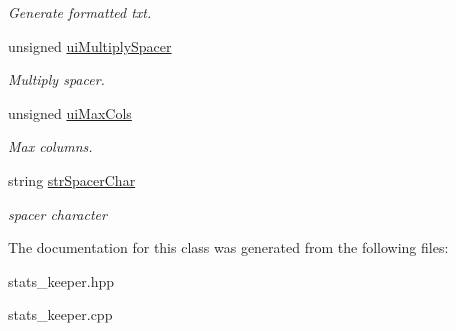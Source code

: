 \begin{DoxyCompactItemize}
\begin{DoxyCompactList}\small\item\em Generate formatted txt. \item\end{DoxyCompactList}\item 
\hypertarget{classstats__keeper_a77ee69cc8b6a80296c69b8af4de678f1}{
unsigned \hyperlink{classstats__keeper_a77ee69cc8b6a80296c69b8af4de678f1}{uiMultiplySpacer}}
\label{classstats__keeper_a77ee69cc8b6a80296c69b8af4de678f1}

\begin{DoxyCompactList}\small\item\em Multiply spacer. \item\end{DoxyCompactList}\item 
\hypertarget{classstats__keeper_ac5ad6cbbee0763290d1569ee7ff70b29}{
unsigned \hyperlink{classstats__keeper_ac5ad6cbbee0763290d1569ee7ff70b29}{uiMaxCols}}
\label{classstats__keeper_ac5ad6cbbee0763290d1569ee7ff70b29}

\begin{DoxyCompactList}\small\item\em Max columns. \item\end{DoxyCompactList}\item 
\hypertarget{classstats__keeper_acd8f177a6ee5df7bb623685fdf8b7c3c}{
string \hyperlink{classstats__keeper_acd8f177a6ee5df7bb623685fdf8b7c3c}{strSpacerChar}}
\label{classstats__keeper_acd8f177a6ee5df7bb623685fdf8b7c3c}

\begin{DoxyCompactList}\small\item\em spacer character \item\end{DoxyCompactList}\end{DoxyCompactItemize}


The documentation for this class was generated from the following files:\begin{DoxyCompactItemize}
\item 
stats\_\-keeper.hpp\item 
stats\_\-keeper.cpp\end{DoxyCompactItemize}
